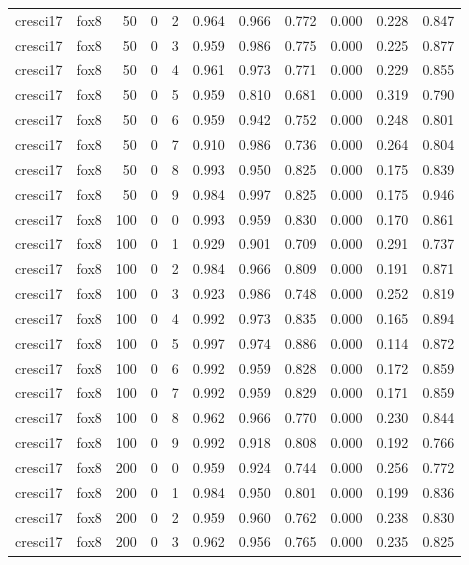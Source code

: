 \begin{tabular}{llrrrrrrrrr}
cresci17 & fox8 & 50 & 0 & 2 & 0.964 & 0.966 & 0.772 & 0.000 & 0.228 & 0.847 \\
cresci17 & fox8 & 50 & 0 & 3 & 0.959 & 0.986 & 0.775 & 0.000 & 0.225 & 0.877 \\
cresci17 & fox8 & 50 & 0 & 4 & 0.961 & 0.973 & 0.771 & 0.000 & 0.229 & 0.855 \\
cresci17 & fox8 & 50 & 0 & 5 & 0.959 & 0.810 & 0.681 & 0.000 & 0.319 & 0.790 \\
cresci17 & fox8 & 50 & 0 & 6 & 0.959 & 0.942 & 0.752 & 0.000 & 0.248 & 0.801 \\
cresci17 & fox8 & 50 & 0 & 7 & 0.910 & 0.986 & 0.736 & 0.000 & 0.264 & 0.804 \\
cresci17 & fox8 & 50 & 0 & 8 & 0.993 & 0.950 & 0.825 & 0.000 & 0.175 & 0.839 \\
cresci17 & fox8 & 50 & 0 & 9 & 0.984 & 0.997 & 0.825 & 0.000 & 0.175 & 0.946 \\
cresci17 & fox8 & 100 & 0 & 0 & 0.993 & 0.959 & 0.830 & 0.000 & 0.170 & 0.861 \\
cresci17 & fox8 & 100 & 0 & 1 & 0.929 & 0.901 & 0.709 & 0.000 & 0.291 & 0.737 \\
cresci17 & fox8 & 100 & 0 & 2 & 0.984 & 0.966 & 0.809 & 0.000 & 0.191 & 0.871 \\
cresci17 & fox8 & 100 & 0 & 3 & 0.923 & 0.986 & 0.748 & 0.000 & 0.252 & 0.819 \\
cresci17 & fox8 & 100 & 0 & 4 & 0.992 & 0.973 & 0.835 & 0.000 & 0.165 & 0.894 \\
cresci17 & fox8 & 100 & 0 & 5 & 0.997 & 0.974 & 0.886 & 0.000 & 0.114 & 0.872 \\
cresci17 & fox8 & 100 & 0 & 6 & 0.992 & 0.959 & 0.828 & 0.000 & 0.172 & 0.859 \\
cresci17 & fox8 & 100 & 0 & 7 & 0.992 & 0.959 & 0.829 & 0.000 & 0.171 & 0.859 \\
cresci17 & fox8 & 100 & 0 & 8 & 0.962 & 0.966 & 0.770 & 0.000 & 0.230 & 0.844 \\
cresci17 & fox8 & 100 & 0 & 9 & 0.992 & 0.918 & 0.808 & 0.000 & 0.192 & 0.766 \\
cresci17 & fox8 & 200 & 0 & 0 & 0.959 & 0.924 & 0.744 & 0.000 & 0.256 & 0.772 \\
cresci17 & fox8 & 200 & 0 & 1 & 0.984 & 0.950 & 0.801 & 0.000 & 0.199 & 0.836 \\
cresci17 & fox8 & 200 & 0 & 2 & 0.959 & 0.960 & 0.762 & 0.000 & 0.238 & 0.830 \\
cresci17 & fox8 & 200 & 0 & 3 & 0.962 & 0.956 & 0.765 & 0.000 & 0.235 & 0.825 \\

\end{tabular}
